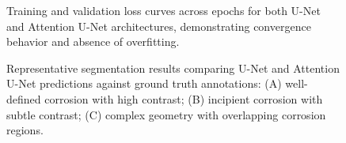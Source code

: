 \documentclass[Journal,letterpaper]{ascelike-new}
\begin{document}
\begin{figure}[htbp]
\caption{Training and validation loss curves across epochs for both U-Net and Attention U-Net architectures, demonstrating convergence behavior and absence of overfitting.}
\label{fig:learning_curves}
\end{figure}

\begin{figure}[htbp]
\caption{Representative segmentation results comparing U-Net and Attention U-Net predictions against ground truth annotations: (A) well-defined corrosion with high contrast; (B) incipient corrosion with subtle contrast; (C) complex geometry with overlapping corrosion regions.}
\label{fig:segmentation_comparison}
\end{figure}
\end{document}
